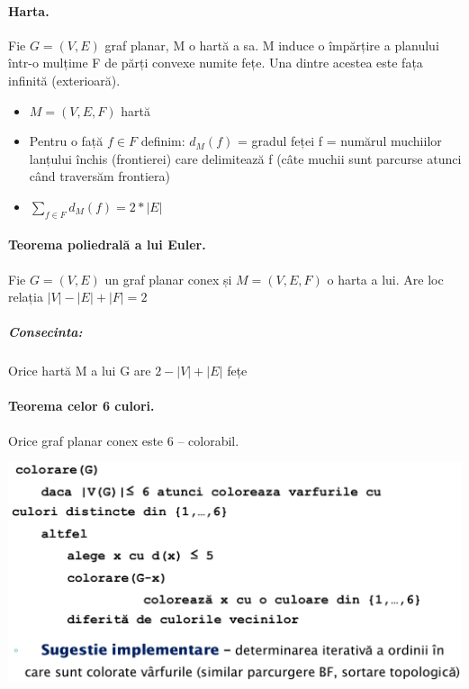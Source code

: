 \documentclass{article}
\begin{document}
\paragraph*{Harta.} Fie $G = (V, E)$ graf planar, M o hartă a sa. M induce o împărțire a planului într-o mulțime F de părți convexe numite fețe. Una dintre acestea este fața infinită (exterioară).
\begin{itemize}
    \item $M = (V, E, F)$ hartă
    \item Pentru o față $f \in F$ definim: $d_M(f)$ = gradul feței f = numărul muchiilor lanțului închis (frontierei) care delimitează f (câte muchii sunt parcurse atunci când traversăm frontiera)
    \item $\sum_{f \in F} d_M(f) = 2 * |E|$
\end{itemize}

\paragraph*{Teorema poliedrală a lui Euler.} Fie $G=(V, E)$ un graf planar conex și $M = (V, E, F)$ o harta a lui. Are loc relația $|V| - |E| + |F| = 2$
\subparagraph*{Consecinta:} Orice hartă M a lui G are $2 - |V| + |E|$ fețe
\paragraph*{Teorema celor 6 culori.} Orice graf planar conex este 6 – colorabil.
\begin{center}
    \includegraphics[scale=0.3]{14_grafplanar_6colorabil.png}
\end{center}
\end{document}
